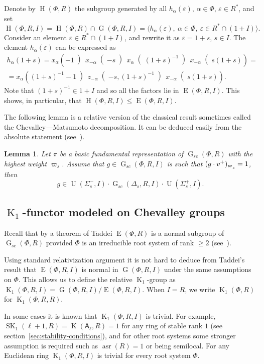 \documentclass[oneside, 12pt]{amsart}
\theoremstyle{plain}
\numberwithin{equation}{section}
\newtheorem{lemma}{Lemma}
\numberwithin{lemma}{section}
\theoremstyle{definition}
\theoremstyle{remark}
\DeclareMathOperator{\K}{K}
\DeclareMathOperator{\SK}{SK}
\DeclareMathOperator{\G}{G}
\DeclareMathOperator{\E}{E}
\DeclareMathOperator{\Hh}{H}
\DeclareMathOperator{\U}{U}
\DeclareMathOperator{\asr}{asr}
\newcommand{\rA}{\mathsf{A}}
\def\ssub#1{\mathchoice
   {_{\lower2pt\hbox{$\scriptstyle #1$}}}
   {_{\lower2pt\hbox{$\scriptstyle #1$}}}
   {_{\lower1.5pt\hbox{$\scriptscriptstyle #1$}}}
   {_{\!\lower1.5pt\hbox{$\scriptscriptstyle #1$}}}}
\begin{document}
Denote by $\Hh(\Phi, R)$ the subgroup generated by all $h_\alpha(\varepsilon)$, $\alpha\in\Phi$, $\varepsilon\in R^*$, and set
\[ \Hh(\Phi, R, I) = \Hh(\Phi, R)\cap\G(\Phi, R, I)=\langle h_\alpha(\varepsilon), \ \alpha\in\Phi, \ \varepsilon\in R^*\cap(1+I)\rangle. \]
Consider an element $\varepsilon\in R^*\cap(1+I)$, and rewrite it as $\varepsilon=1+s$, $s\in I$. The element $h_\alpha(\varepsilon)$ can be expressed as
\begin{multline} \label{eq:rel-tor-elementary}
h_\alpha(1+s) = x_\alpha\left(-1\middle)\, x_{-\alpha}\middle(-s\middle)\, x_\alpha\middle((1+s)^{-1}\middle)\, x_{-\alpha}\middle(s(1+s)\right) = \\
= x_\alpha\left((1+s)^{-1}-1\middle)\, z_{-\alpha}\middle(-s, (1+s)^{-1}\middle)\, x_{-\alpha}\middle(s(1+s)\right).
\end{multline}
Note that $(1+s)^{-1}\in 1+I$ and so all the factors lie in $\E(\Phi, R, I)$. This shows, in particular, that $\Hh(\Phi, R, I) \leqslant \E(\Phi, R, I)$.

The following lemma is a relative version of the classical result sometimes called the Chevalley---Matsumoto decomposition.
It can be deduced easily from the absolute statement (see~\cite[Theorem~1.3]{St78}).
\begin{lemma}\label{lemma:Chevalley-Matsumoto}
Let $\pi$ be a basic fundamental representation of $\G_{sc}(\Phi, R)$ with the highest weight $\varpi_s$.
Assume that $g\in \G_{sc}(\Phi, R, I)$ is such that $(g\cdot v^+)_{\varpi\ssub{s}}=1$, then 
\[ g \in \U(\Sigma_s^-, I) \cdot \G_{sc}(\Delta_s, R, I) \cdot \U(\Sigma_s^+, I). \]
\end{lemma}

\subsection{\texorpdfstring{$\K_1$}{K1}-functor modeled on Chevalley groups}
Recall that by a theorem of Taddei $\E(\Phi, R)$ is a normal subgroup of $\G_{sc}(\Phi, R)$ provided $\Phi$ is an irreducible root system of rank $\geqslant 2$ (see~\cite{Ta}).

Using standard relativization argument it is not hard to deduce from Taddei's result that $\E(\Phi, R, I)$ is normal in $\G(\Phi, R, I)$ under the same assumptions on $\Phi$.
This allows us to define the relative $\K_1$-group as $\K_1(\Phi, R, I)=\G(\Phi, R, I)/\E(\Phi, R, I).$
When $I=R$, we write $\K_1(\Phi, R)$ for $\K_1(\Phi, R, R)$.

In some cases it is known that $\K_1(\Phi, R, I)$ is trivial.
For example, $\SK_1(\ell+1, R)=\K(\rA_\ell, R)=1$ for any ring of stable rank $1$ (see section~\ref{sec:stability-conditions}), 
and for other root systems some stronger assumption is required such as $\asr(R)=1$ or being semilocal. 
For any Euclidean ring $\K_1(\Phi, R, I)$ is trivial for every root system $\Phi$.
\end{document}
